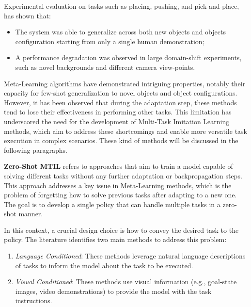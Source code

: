 
\newline Experimental evaluation on tasks such as placing, pushing, and pick-and-place, has shown that: \begin{itemize}
    \item The system was able to generalize across both new objects and objects configuration starting from only a single human demonstration;
    \item A performance degradation was observed in large domain-shift experiments, such as novel backgrounds and different camera view-points.
\end{itemize}


Meta-Learning algorithms have demonstrated intriguing properties, notably their capacity for few-shot generalization to novel objects and object configurations. However, it has been observed that during the adaptation step, these methods tend to lose their effectiveness in performing other tasks. This limitation has underscored the need for the development of Multi-Task Imitation Learning methods, which aim to address these shortcomings and enable more versatile task execution in complex scenarios. These kind of methods will be discussed in the following paragraphs.

\textbf{Zero-Shot MTIL} refers to approaches that aim to train a model capable of solving different tasks without any further adaptation or backpropagation steps. This approach addresses a key issue in Meta-Learning methods, which is the problem of forgetting how to solve previous tasks after adapting to a new one. The goal is to develop a single policy that can handle multiple tasks in a zero-shot manner.

In this context, a crucial design choice is how to convey the desired task to the policy. The literature identifies two main methods to address this problem:

\begin{enumerate}
    \item \textit{Language Conditioned}: These methods leverage natural language descriptions of tasks to inform the model about the task to be executed.
    \item \textit{Visual Conditioned}: These methods use visual information (e.g., goal-state images, video demonstrations) to provide the model with the task instructions.
\end{enumerate}

